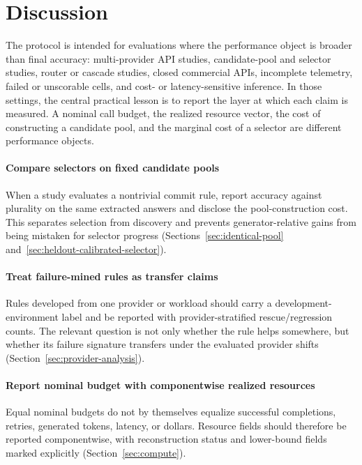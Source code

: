 \section{Discussion}
\label{sec:discussion}

The protocol is intended for evaluations where the performance object is broader than final
accuracy: multi-provider API studies, candidate-pool and selector studies, router or cascade
studies, closed commercial APIs, incomplete telemetry, failed or unscorable cells, and cost- or
latency-sensitive inference. In those settings, the central practical lesson is to report the layer
at which each claim is measured. A nominal call budget, the realized resource vector, the cost of
constructing a candidate pool, and the marginal cost of a selector are different performance
objects.

\paragraph{Compare selectors on fixed candidate pools}
When a study evaluates a nontrivial commit rule, report accuracy against plurality on the same
extracted answers and disclose the pool-construction cost. This separates selection from discovery
and prevents generator-relative gains from being mistaken for selector progress
(Sections~\ref{sec:identical-pool} and~\ref{sec:heldout-calibrated-selector}).

\paragraph{Treat failure-mined rules as transfer claims}
Rules developed from one provider or workload should carry a development-environment label and be
reported with provider-stratified rescue/regression counts. The relevant question is not only
whether the rule helps somewhere, but whether its failure signature transfers under the evaluated
provider shifts (Section~\ref{sec:provider-analysis}).

\paragraph{Report nominal budget with componentwise realized resources}
Equal nominal budgets do not by themselves equalize successful completions, retries, generated
tokens, latency, or dollars. Resource fields should therefore be reported componentwise, with
reconstruction status and lower-bound fields marked explicitly (Section~\ref{sec:compute}).

